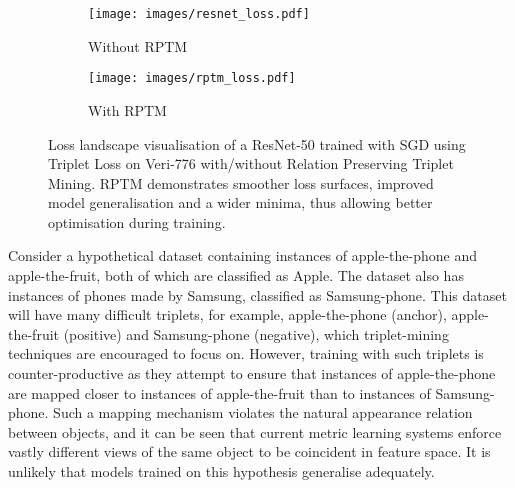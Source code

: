 \documentclass[10pt,twocolumn,letterpaper]{article}
\begin{document}
\begin{figure*}[t]
\begin{center}
     \begin{subfigure}[b]{0.37\linewidth}
         \centering
         \texttt{[image: images/resnet\_loss.pdf]}
         \caption{Without RPTM}
         \label{fig:resnet_loss}
     \end{subfigure}
\begin{subfigure}[b]{0.37\linewidth}
         \centering
         \texttt{[image: images/rptm\_loss.pdf]}
         \caption{With RPTM}
         \label{fig:rptm_loss}
     \end{subfigure}
     \caption{Loss landscape visualisation of  a ResNet-50 trained with SGD using Triplet Loss on Veri-776 with/without Relation Preserving Triplet Mining. RPTM demonstrates smoother loss surfaces, improved model generalisation and a wider minima, thus allowing better optimisation during training.}
    \label{fig:loss}
\end{center}
\end{figure*}

Consider a hypothetical dataset  containing instances of apple-the-phone and apple-the-fruit, both of which are classified as Apple. The dataset also has instances of phones made by Samsung, classified as Samsung-phone. 
This dataset will have many  difficult triplets, for example, 
apple-the-phone (anchor), apple-the-fruit (positive) and Samsung-phone (negative), which
triplet-mining techniques are encouraged to focus on. However, training with  such triplets is  counter-productive as they attempt to  ensure that instances of apple-the-phone are mapped  closer to instances of apple-the-fruit than  to 
instances of Samsung-phone. 
Such a mapping mechanism violates the natural appearance relation between objects, and it can be seen that current metric learning systems enforce vastly different views of the same object to be coincident in feature space. It is unlikely that models trained on this hypothesis generalise adequately. 
\end{document}
